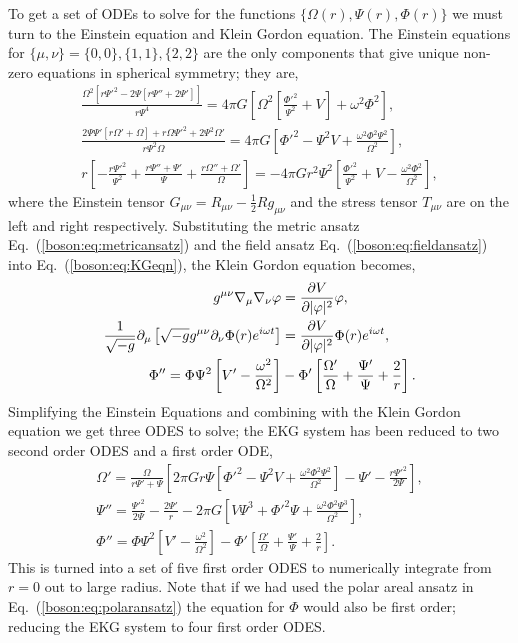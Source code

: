 To get a set of ODEs to solve for the functions $\{\Omega(r), \Psi(r),\Phi(r)\}$ we must turn to the Einstein equation and Klein Gordon equation. The Einstein equations for $\{\mu,\nu\}=\{0,0\},\{1,1\},\{2,2\}$ are the only components that give unique non-zero equations in spherical symmetry; they are,
\begin{gather}
\frac{\Omega ^2 \left[r \Psi '^2-2 \Psi  \left[r \Psi ''+2 \Psi '\right]\right]}{r \Psi ^4} = 4\pi G \left[\Omega ^2 \left[\frac{\Phi'^2}{\Psi ^2}+V\right]+\omega ^2 \Phi^2\right],\\
\frac{2 \Psi  \Psi ' \left[r \Omega '+\Omega \right]+r \Omega  \Psi '^2+2 \Psi ^2 \Omega
   '}{r \Psi ^2 \Omega } = 4\pi G \left[\Phi'^2-\Psi ^2 V+\frac{\omega ^2 \Phi^2 \Psi ^2}{\Omega
   ^2}\right],\\
   r \left[-\frac{r \Psi '^2}{\Psi ^2}+\frac{r \Psi ''+\Psi '}{\Psi }+\frac{r \Omega ''+\Omega
   '}{\Omega }\right] = -4\pi G r^2 \Psi ^2 \left[\frac{\Phi'^2}{\Psi ^2}+V-\frac{\omega ^2 \Phi^2}{\Omega
   ^2}\right],
   \end{gather}
  where the Einstein tensor $G_{\mu\nu} = R_{\mu\nu}-\frac{1}{2}R g_{\mu\nu}$  and the stress tensor $T_{\mu\nu}$ are on the left and right respectively. Substituting the metric ansatz Eq.~(\ref{boson:eq:metricansatz}) and the field ansatz Eq.~(\ref{boson:eq:fieldansatz}) into Eq.~(\ref{boson:eq:KGeqn}), the Klein Gordon equation becomes,
  \begin{align}
  g^{\mu\nu}\nabla_\mu\nabla_\nu \varphi &= \frac{\partial V}{\partial |\varphi|^2}\varphi ,\\
   \frac{1}{\sqrt{-g}}\partial_\mu \left[ \sqrt{-g}g^{\mu\nu}\partial_\nu \Phi(r)e^{i\omega t}\right] &= \frac{\partial V}{\partial |\varphi|^2} \Phi(r)e^{i\omega t} ,\\
  \Phi'' = \Phi\Psi^2\left[V'-\frac{\omega^2}{\Omega^2}\right] &- \Phi'\left[\frac{\Omega'}{\Omega} +\frac{\Psi'}{\Psi}+\frac{2}{r} \right].
  \end{align}
Simplifying the Einstein Equations and combining with the Klein Gordon equation we get three ODES to solve; the EKG system has been reduced to two second order ODES and a first order ODE,
\begin{gather}
\Omega '=\frac{\Omega}{r\Psi'+\Psi}\left[2 \pi  G r \Psi \left[\Phi'^2 -\Psi^2
   V+\frac{\omega ^2 \Phi^2 \Psi^2}{\Omega^2} \right]  -\Psi '-\frac{r \Psi '^2}{2 \Psi} \right] \label{boson:eq:EKGODE1}
,\\{ \Psi'' = \frac{\Psi'^2}{2\Psi} - \frac{2\Psi'}{r}-2\pi G \left[V \Psi^3 + \Phi'^2\Psi+ \frac{ \omega^2\Phi^2\Psi^3}{\Omega^2}\right] } \label{boson:eq:EKGODE2}
,\\ \Phi'' = \Phi\Psi^2\left[V'-\frac{\omega^2}{\Omega^2}\right] - \Phi'\left[\frac{\Omega'}{\Omega} +\frac{\Psi'}{\Psi}+\frac{2}{r} \right]. \label{boson:eq:EKGODE3}
\end{gather}
This is turned into a set of five first order ODES to numerically integrate from $r=0$ out to large radius. Note that if we had used the polar areal ansatz in Eq.~(\ref{boson:eq:polaransatz}) the equation for $\Phi$ would also be first order; reducing the EKG system to four first order ODES.

